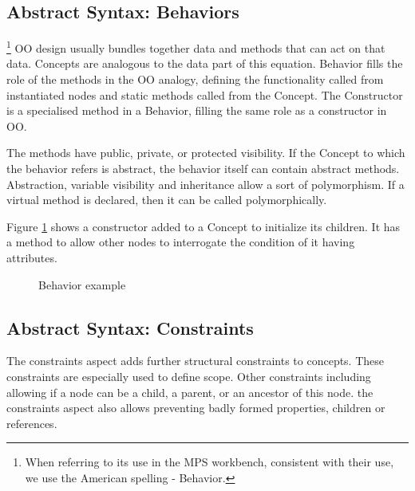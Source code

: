 \subsection{Abstract Syntax: Behaviors}
\footnote{When referring to its use in the MPS workbench, consistent with their use, we use the American spelling - Behavior.}
OO design usually bundles together data and methods that can act on that data.
Concepts are analogous to the data part of this equation.
Behavior fills the role of the methods in the OO analogy, defining the functionality called from instantiated nodes and static methods called from the Concept.
The Constructor is a specialised method in a Behavior, filling the same role as a constructor in OO.

The methods have public, private, or protected visibility.
If the Concept to which the behavior refers is abstract, the behavior itself can contain abstract methods.
Abstraction, variable visibility and inheritance allow a sort of polymorphism.
If a virtual method is declared, then it can be called polymorphically.

Figure \ref{fig:behavior_example} shows a constructor added to a Concept to initialize its children.
It has a method to allow other nodes to interrogate the condition of it having attributes.

\begin{figure}[h]
    \centering
    \caption{Behavior example}
    \label{fig:behavior_example}
\end{figure}
 

\subsection{Abstract Syntax: Constraints}
The constraints aspect adds further structural constraints to concepts.
These constraints are especially used to define scope.
Other constraints including allowing if a node can be a child, a parent, or an ancestor of this node.
the constraints aspect also allows preventing badly formed properties, children or references.

